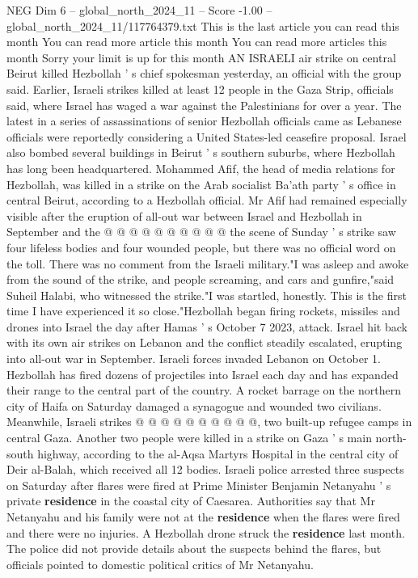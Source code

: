\begin{textsample}{NEG Dim 6 – global\_north\_2024\_11 – Score -1.00 – global\_north\_2024\_11/117764379.txt}  \label{ex:f6_neg_106}
This is the last article you can read this month You can read more article this month You can read more articles this month Sorry your limit is up for this month AN ISRAELI air strike on central Beirut killed Hezbollah ' s chief spokesman yesterday, an official with the group said.
Earlier, Israeli strikes killed at least 12 people in the Gaza Strip, officials said, where Israel has waged a war against the Palestinians for over a year.
The latest in a series of assassinations of senior Hezbollah officials came as Lebanese officials were reportedly considering a United States-led ceasefire proposal.
Israel also bombed several buildings in Beirut ' s southern suburbs, where Hezbollah has long been headquartered.
Mohammed Afif, the head of media relations for Hezbollah, was killed in a strike on the Arab socialist Ba'ath party ' s office in central Beirut, according to a Hezbollah official.
Mr Afif had remained especially visible after the eruption of all-out war between Israel and Hezbollah in September and the @ @ @ @ @ @ @ @ @ @ the scene of Sunday ' s strike saw four lifeless bodies and four wounded people, but there was no official word on the toll.
There was no comment from the Israeli military."I was asleep and awoke from the sound of the strike, and people screaming, and cars and gunfire,"said Suheil Halabi, who witnessed the strike."I was startled, honestly.
This is the first time I have experienced it so close."Hezbollah began firing rockets, missiles and drones into Israel the day after Hamas ' s October 7 2023, attack.
Israel hit back with its own air strikes on Lebanon and the conflict steadily escalated, erupting into all-out war in September.
Israeli forces invaded Lebanon on October 1.
Hezbollah has fired dozens of projectiles into Israel each day and has expanded their range to the central part of the country.
A rocket barrage on the northern city of Haifa on Saturday damaged a synagogue and wounded two civilians.
Meanwhile, Israeli strikes @ @ @ @ @ @ @ @ @ @, two built-up refugee camps in central Gaza.
Another two people were killed in a strike on Gaza ' s main north-south highway, according to the al-Aqsa Martyrs Hospital in the central city of Deir al-Balah, which received all 12 bodies.
Israeli police arrested three suspects on Saturday after flares were fired at Prime Minister Benjamin Netanyahu ' s private \textbf{residence} in the coastal city of Caesarea.
Authorities say that Mr Netanyahu and his family were not at the \textbf{residence} when the flares were fired and there were no injuries.
A Hezbollah drone struck the \textbf{residence} last month.
The police did not provide details about the suspects behind the flares, but officials pointed to domestic political critics of Mr Netanyahu.

\end{textsample}

